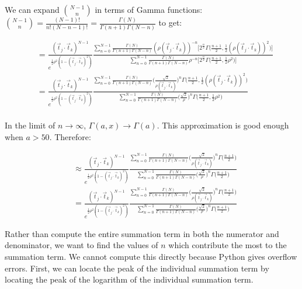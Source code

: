 \documentclass[12pt]{article}
\newcommand{\ptjtk}{\rho(\vec{t}_j\cdot\vec{t}_k)}
\newcommand{\tjtk}{(\vec{t}_j\cdot\vec{t}_k)}
\begin{document}
We can expand $\binom{N-1}{n}$ in terms of Gamma functions: $\binom{N-1}{n} = \frac{(N-1)!}{n!(N-n-1)!} = \frac{\Gamma(N)}{\Gamma(n+1)\Gamma(N-n)}$ to get:%

   \begin{align}
   &= \frac{\tjtk^{N-1}}{e^{\frac{1}{2}\rho^2(1-\tjtk^2)}} \frac{ \sum_{n=0}^{N-1} \frac{\Gamma(N)}{\Gamma(n+1)\Gamma(N-n)} (\ptjtk)^{-n} \Big[ 2^{\frac{n}{2}}\Gamma\Big(\frac{n+1}{2},\frac{1}{2}(\ptjtk)^2\Big) \Big]} 
   { \sum_{n=0}^{N-1} \frac{\Gamma(N)}{\Gamma(n+1)\Gamma(N-n)} \rho^{-n}  \Big[ 2^{\frac{n}{2}}\Gamma\Big(\frac{n+1}{2},\frac{1}{2}\rho^2\Big) \Big] } \\
   &= \frac{\tjtk^{N-1}}{e^{\frac{1}{2}\rho^2(1-\tjtk^2)}} \frac{ \sum_{n=0}^{N-1} \frac{\Gamma(N)}{\Gamma(n+1)\Gamma(N-n)} \Big(\frac{\sqrt{2}}{\ptjtk}\Big)^{n} \Gamma\Big(\frac{n+1}{2},\frac{1}{2}(\ptjtk)^2\Big) } 
   { \sum_{n=0}^{N-1} \frac{\Gamma(N)}{\Gamma(n+1)\Gamma(N-n)} \Big(\frac{\sqrt{2}}{\rho}\Big)^{n} \Gamma\Big(\frac{n+1}{2},\frac{1}{2}\rho^2\Big) } \\
   \end{align}
  
In the limit of $n \rightarrow \infty$, $\Gamma(a,x) \rightarrow \Gamma(a)$. This approximation is good enough when $a > 50$. Therefore:
   
   \begin{align}
   &\approx \frac{\tjtk^{N-1}}{e^{\frac{1}{2}\rho^2(1-\tjtk^2)}} \frac{ \sum_{n=0}^{N-1} \frac{\Gamma(N)}{\Gamma(n+1)\Gamma(N-n)} \Big(\frac{\sqrt{2}}{\ptjtk}\Big)^{n} \Gamma\Big(\frac{n+1}{2}\Big) } 
   { \sum_{n=0}^{N-1} \frac{\Gamma(N)}{\Gamma(n+1)\Gamma(N-n)} \Big(\frac{\sqrt{2}}{\rho}\Big)^{n} \Gamma\Big(\frac{n+1}{2}\Big) } \\
   &= \frac{\tjtk^{N-1}}{e^{\frac{1}{2}\rho^2(1-\tjtk^2)}} \frac{ \sum_{n=0}^{N-1} \frac{\Gamma(N)}{\Gamma(n+1)\Gamma(N-n)} \Big(\frac{\sqrt{2}}{\ptjtk}\Big)^{n} \Gamma\Big(\frac{n+1}{2}\Big) } 
   { \sum_{n=0}^{N-1} \frac{\Gamma(N)}{\Gamma(n+1)\Gamma(N-n)} \Big(\frac{\sqrt{2}}{\rho}\Big)^{n} \Gamma\Big(\frac{n+1}{2}\Big) }
   \end{align}
   
Rather than compute the entire summation term in both the numerator and denominator, we want to find the values of $n$ which contribute the most to the summation term. We cannot compute this directly because Python gives overflow errors. First, we can locate the peak of the individual summation term by locating the peak of the logarithm of the individual summation term.
\end{document}
